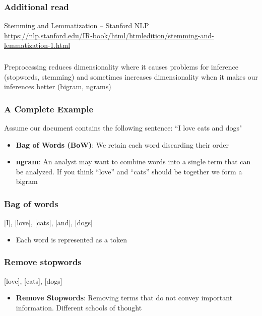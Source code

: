 \documentclass[compress, aspectratio=54]{beamer}
\begin{document}
\begin{frame}
\frametitle{Additional read}
Stemming and Lemmatization -- Stanford NLP\\
\url{https://nlp.stanford.edu/IR-book/html/htmledition/stemming-and-lemmatization-1.html}
\end{frame}

\begin{frame}
\frametitle{}
Preprocessing reduces dimensionality where it causes problems for
inference (stopwords, stemming) and sometimes increases
dimensionality when it makes our inferences better (bigram, ngrams)
\end{frame}



\begin{frame}
\frametitle{A Complete Example}
Assume our document contains the following sentence: ``I love cats and dogs" 
\begin{itemize}

\item \textbf{Bag of Words (BoW)}:  We retain each word discarding their order 

\item \textbf{ngram}: An analyst may want to combine words into a single
term that can be analyzed. If you think ``love'' and ``cats'' should be together we form a bigram
\end{itemize}

\end{frame}

\begin{frame}
\frametitle{Bag of words }
[I], [love], [cats], [and], [dogs] 

\begin{itemize}
\item Each word is represented as a token
\end{itemize}
\end{frame}


\begin{frame}
\frametitle{Remove stopwords}
[love], [cats],  [dogs] 
\begin{itemize}

\item \textbf{Remove Stopwords}: Removing terms that do not convey important information. Different schools of thought
\end{itemize}

\end{frame}
\end{document}
